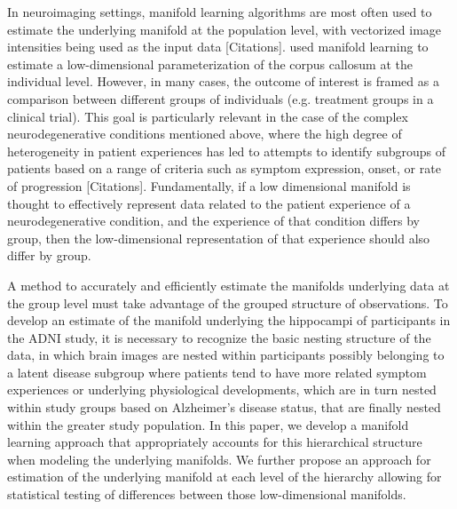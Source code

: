 \documentclass[11pt,reqno]{article}
\theoremstyle{definition}
\begin{document}
In neuroimaging settings, manifold learning algorithms are most often used to estimate the underlying manifold at the population level, with vectorized image intensities being used as the input data [Citations]. \cite{yueParameterizationWhiteMatter2016} used manifold learning to estimate a low-dimensional parameterization of the corpus callosum at the individual level. However, in many cases, the outcome of interest is framed as a comparison between different groups of individuals (e.g. treatment groups in a clinical trial). This goal is particularly relevant in the case of the complex neurodegenerative conditions mentioned above, where the high degree of heterogeneity in patient experiences has led to attempts to identify subgroups of patients based on a range of criteria such as symptom expression, onset, or rate of progression [Citations]. Fundamentally, if a low dimensional manifold is thought to effectively represent data related to the patient experience of a neurodegenerative condition, and the experience of that condition differs by group, then the low-dimensional representation of that experience should also differ by group.

A method to accurately and efficiently estimate the manifolds underlying data at the group level must take advantage of the grouped structure of observations. To develop an estimate of the manifold underlying the hippocampi of participants in the ADNI study, it is necessary to recognize the basic nesting structure of the data, in which brain images are nested within participants possibly belonging to a latent disease subgroup where patients tend to have more related symptom experiences or underlying physiological developments, which are in turn nested within study groups based on Alzheimer's disease status, that are finally nested within the greater study population. In this paper, we develop a manifold learning approach that appropriately accounts for this hierarchical structure when modeling the underlying manifolds. We further propose an approach for estimation of the underlying manifold at each level of the hierarchy allowing for statistical testing of differences between those low-dimensional manifolds.
\end{document}
